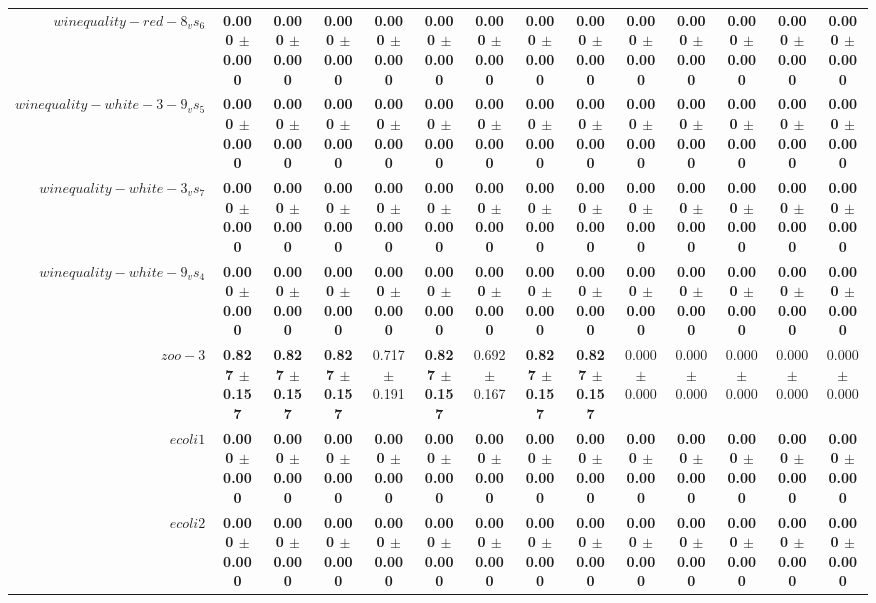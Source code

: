 \begin{table}[!ht]
{\begin{tabular}{r c c c c c c c c c c c c c}
$winequality-red-8_vs_6$ & \textbf{0.000 $\pm$ 0.000} & \textbf{0.000 $\pm$ 0.000} & \textbf{0.000 $\pm$ 0.000} & \textbf{0.000 $\pm$ 0.000} & \textbf{0.000 $\pm$ 0.000} & \textbf{0.000 $\pm$ 0.000} & \textbf{0.000 $\pm$ 0.000} & \textbf{0.000 $\pm$ 0.000} & \textbf{0.000 $\pm$ 0.000} & \textbf{0.000 $\pm$ 0.000} & \textbf{0.000 $\pm$ 0.000} & \textbf{0.000 $\pm$ 0.000} & \textbf{0.000 $\pm$ 0.000} \\
$winequality-white-3-9_vs_5$ & \textbf{0.000 $\pm$ 0.000} & \textbf{0.000 $\pm$ 0.000} & \textbf{0.000 $\pm$ 0.000} & \textbf{0.000 $\pm$ 0.000} & \textbf{0.000 $\pm$ 0.000} & \textbf{0.000 $\pm$ 0.000} & \textbf{0.000 $\pm$ 0.000} & \textbf{0.000 $\pm$ 0.000} & \textbf{0.000 $\pm$ 0.000} & \textbf{0.000 $\pm$ 0.000} & \textbf{0.000 $\pm$ 0.000} & \textbf{0.000 $\pm$ 0.000} & \textbf{0.000 $\pm$ 0.000} \\
$winequality-white-3_vs_7$ & \textbf{0.000 $\pm$ 0.000} & \textbf{0.000 $\pm$ 0.000} & \textbf{0.000 $\pm$ 0.000} & \textbf{0.000 $\pm$ 0.000} & \textbf{0.000 $\pm$ 0.000} & \textbf{0.000 $\pm$ 0.000} & \textbf{0.000 $\pm$ 0.000} & \textbf{0.000 $\pm$ 0.000} & \textbf{0.000 $\pm$ 0.000} & \textbf{0.000 $\pm$ 0.000} & \textbf{0.000 $\pm$ 0.000} & \textbf{0.000 $\pm$ 0.000} & \textbf{0.000 $\pm$ 0.000} \\
$winequality-white-9_vs_4$ & \textbf{0.000 $\pm$ 0.000} & \textbf{0.000 $\pm$ 0.000} & \textbf{0.000 $\pm$ 0.000} & \textbf{0.000 $\pm$ 0.000} & \textbf{0.000 $\pm$ 0.000} & \textbf{0.000 $\pm$ 0.000} & \textbf{0.000 $\pm$ 0.000} & \textbf{0.000 $\pm$ 0.000} & \textbf{0.000 $\pm$ 0.000} & \textbf{0.000 $\pm$ 0.000} & \textbf{0.000 $\pm$ 0.000} & \textbf{0.000 $\pm$ 0.000} & \textbf{0.000 $\pm$ 0.000} \\
$zoo-3$ & \textbf{0.827 $\pm$ 0.157} & \textbf{0.827 $\pm$ 0.157} & \textbf{0.827 $\pm$ 0.157} & 0.717 $\pm$ 0.191 & \textbf{0.827 $\pm$ 0.157} & 0.692 $\pm$ 0.167 & \textbf{0.827 $\pm$ 0.157} & \textbf{0.827 $\pm$ 0.157} & 0.000 $\pm$ 0.000 & 0.000 $\pm$ 0.000 & 0.000 $\pm$ 0.000 & 0.000 $\pm$ 0.000 & 0.000 $\pm$ 0.000 \\
$ecoli1$ & \textbf{0.000 $\pm$ 0.000} & \textbf{0.000 $\pm$ 0.000} & \textbf{0.000 $\pm$ 0.000} & \textbf{0.000 $\pm$ 0.000} & \textbf{0.000 $\pm$ 0.000} & \textbf{0.000 $\pm$ 0.000} & \textbf{0.000 $\pm$ 0.000} & \textbf{0.000 $\pm$ 0.000} & \textbf{0.000 $\pm$ 0.000} & \textbf{0.000 $\pm$ 0.000} & \textbf{0.000 $\pm$ 0.000} & \textbf{0.000 $\pm$ 0.000} & \textbf{0.000 $\pm$ 0.000} \\
$ecoli2$ & \textbf{0.000 $\pm$ 0.000} & \textbf{0.000 $\pm$ 0.000} & \textbf{0.000 $\pm$ 0.000} & \textbf{0.000 $\pm$ 0.000} & \textbf{0.000 $\pm$ 0.000} & \textbf{0.000 $\pm$ 0.000} & \textbf{0.000 $\pm$ 0.000} & \textbf{0.000 $\pm$ 0.000} & \textbf{0.000 $\pm$ 0.000} & \textbf{0.000 $\pm$ 0.000} & \textbf{0.000 $\pm$ 0.000} & \textbf{0.000 $\pm$ 0.000} & \textbf{0.000 $\pm$ 0.000} \\

\end{tabular}}
\end{table}
